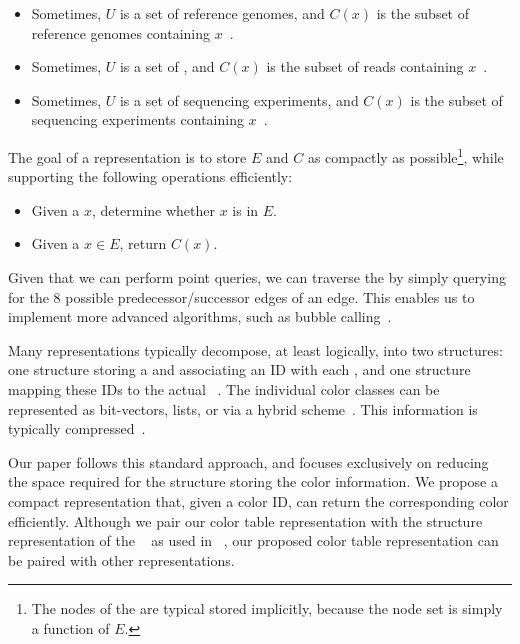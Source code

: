 \begin{itemize}
    \item Sometimes, $U$ is a set of
    reference genomes, and $C(x)$ is the subset of reference genomes
    containing \kmer $x$~\cite{pufferfish,liu2016debga,rainbowfish,MuggliBoNo17}.
    \item Sometimes, $U$ is a set of ,
    and $C(x)$ is the subset of reads containing $x$~\citep{mccortex,alipanahi2018resistome,alipanahi2018recoloring}.
    \item Sometimes, $U$ is a set
    of sequencing experiments, and $C(x)$ is the subset of sequencing experiments containing $x$~\cite{mantis, Solomon2016Fast, Solomon2017Improved, Sun2017Allsome}.
\end{itemize}
The goal of a \cdbg representation is to store $E$ and $C$ as
compactly as possible\footnote{The nodes of the \dbg are typical
stored implicitly, because the node set is simply a function of $E$.},
while supporting the following operations efficiently:
\begin{itemize}
    \item {}  Given a \kmer $x$, determine whether $x$
    is in $E$.
    \item {} Given a \kmer $x\in E$, return $C(x)$.
\end{itemize}

Given that we can perform point queries, we can traverse the \dbg by
simply querying for the 8 possible predecessor/successor edges of an edge. This enables us
to implement more advanced algorithms, such as bubble calling~\cite{IqbalCaTu12}.

Many \cdbg representations typically decompose, at least logically,
into two structures: one structure storing a \dbg and associating an
ID with each \kmer, and one structure mapping these IDs
to the actual \cc~\cite{MuggliBoNo17,rainbowfish,PandeyBeJo17}. The individual
color classes can be represented as bit-vectors, lists, or via a hybrid scheme~\citep{seqothello}.
This information is typically compressed~\cite{RamanRaRa02,Ottaviano2014Partitioned,ziv1977universal}.

Our paper follows this standard approach, and focuses exclusively on reducing
the space required for the structure storing the color information. We
propose a compact representation that, given a color ID, can return the
corresponding color efficiently. Although we pair our color table representation
with the \dbg structure representation of the \cqf~\cite{PandeyBeJo17} as used
in \mantis~\cite{mantis}, our proposed color table
representation can be paired with other \dbg representations.

